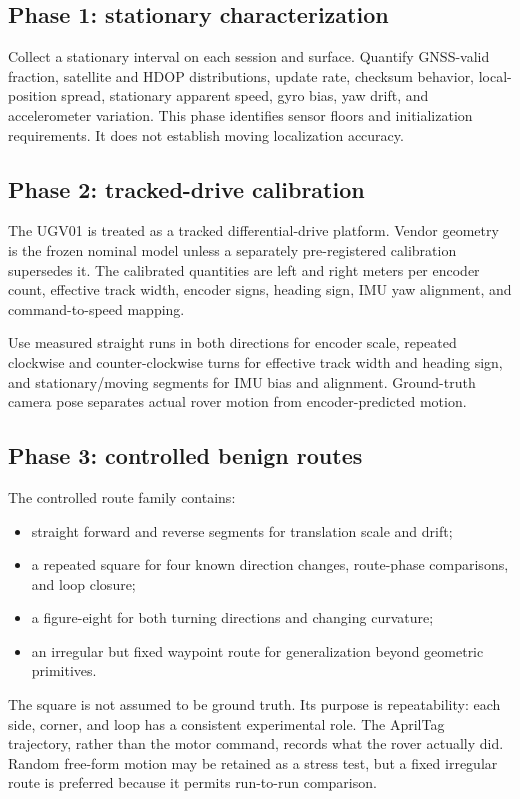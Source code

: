 \documentclass[11pt,a4paper]{article}
\begin{document}
\subsection{Phase 1: stationary characterization}

Collect a stationary interval on each session and surface. Quantify GNSS-valid
fraction, satellite and HDOP distributions, update rate, checksum behavior,
local-position spread, stationary apparent speed, gyro bias, yaw drift, and
accelerometer variation. This phase identifies sensor floors and initialization
requirements. It does not establish moving localization accuracy.

\subsection{Phase 2: tracked-drive calibration}

The UGV01 is treated as a tracked differential-drive platform. Vendor geometry
is the frozen nominal model unless a separately pre-registered calibration
supersedes it. The calibrated quantities are left and right meters per encoder
count, effective track width, encoder signs, heading sign, IMU yaw alignment,
and command-to-speed mapping.

Use measured straight runs in both directions for encoder scale, repeated
clockwise and counter-clockwise turns for effective track width and heading
sign, and stationary/moving segments for IMU bias and alignment. Ground-truth
camera pose separates actual rover motion from encoder-predicted motion.

\subsection{Phase 3: controlled benign routes}

The controlled route family contains:
\begin{itemize}
  \item straight forward and reverse segments for translation scale and drift;
  \item a repeated square for four known direction changes, route-phase
  comparisons, and loop closure;
  \item a figure-eight for both turning directions and changing curvature;
  \item an irregular but fixed waypoint route for generalization beyond
  geometric primitives.
\end{itemize}

The square is not assumed to be ground truth. Its purpose is repeatability:
each side, corner, and loop has a consistent experimental role. The AprilTag
trajectory, rather than the motor command, records what the rover actually did.
Random free-form motion may be retained as a stress test, but a fixed irregular
route is preferred because it permits run-to-run comparison.
\end{document}
